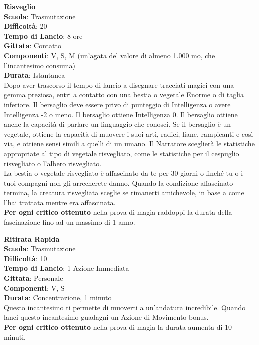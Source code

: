\begin{multicols}{2}
\medskip\textbf{Risveglio}\\
\textbf{Scuola}: Trasmutazione\\
\textbf{Difficoltà}:  20\\
\textbf{Tempo di Lancio}: 8 ore\\
\textbf{Gittata}: Contatto\\
\textbf{Componenti}: V, S, M (un'agata del valore di almeno 1.000 mo, che l'incantesimo consuma)\\
\textbf{Durata}: Istantanea\\
Dopo aver trascorso il tempo di lancio a disegnare tracciati magici con una gemma preziosa, entri a contatto con una bestia o vegetale Enorme o di taglia inferiore. Il bersaglio deve essere privo di punteggio di Intelligenza o avere Intelligenza -2 o meno. Il bersaglio ottiene Intelligenza 0. Il bersaglio ottiene anche la capacità di parlare un linguaggio che conosci. Se il bersaglio è un vegetale, ottiene la capacità di muovere i suoi arti, radici, liane, rampicanti e così via, e ottiene sensi simili a quelli di un umano. Il Narratore sceglierà le statistiche appropriate al tipo di vegetale risvegliato, come le statistiche per il cespuglio risvegliato o l’albero risvegliato.\\
La bestia o vegetale risvegliato è affascinato da te per 30 giorni o finché tu o i tuoi compagni non gli arrecherete danno. Quando la condizione affascinato termina, la creatura risvegliata sceglie se rimanerti amichevole, in base a come l’hai trattata mentre era affascinata.\\
\textbf{Per ogni critico ottenuto} nella prova di magia raddoppi la durata della fascinazione fino ad un massimo di 1 anno.

\medskip\textbf{Ritirata Rapida}\\
\textbf{Scuola}: Trasmutazione\\
\textbf{Difficoltà}:  10\\
\textbf{Tempo di Lancio}: 1 Azione Immediata\\
\textbf{Gittata}: Personale\\
\textbf{Componenti}: V, S\\
\textbf{Durata}: Concentrazione, 1 minuto\\
Questo incantesimo ti permette di muoverti a un'andatura incredibile. Quando lanci questo incantesimo guadagni un Azione di Movimento bonus.\\
\textbf{Per ogni critico ottenuto} nella prova di magia la durata aumenta di 10 minuti,


\end{multicols}
